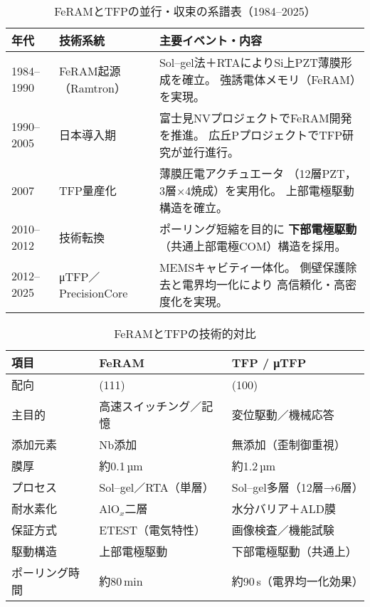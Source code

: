 \documentclass[conference]{IEEEtran}
\begin{document}
\begin{table}[!t]
\centering
\caption{FeRAMとTFPの並行・収束の系譜表（1984--2025）}
\label{tab:timeline}
\renewcommand{\arraystretch}{1.15}
\setlength{\tabcolsep}{2.5pt} %
\scriptsize %

\begin{tabular}{@{}p{1.3cm}p{2.3cm}p{5.0cm}@{}} %
\toprule
\textbf{年代} & \textbf{技術系統} & \textbf{主要イベント・内容} \\ \midrule

1984--1990 & FeRAM起源（Ramtron） &
Sol--gel法＋RTAによりSi上PZT薄膜形成を確立。
強誘電体メモリ（FeRAM）を実現。\\[3pt]

1990--2005 & 日本導入期 &
富士見NVプロジェクトでFeRAM開発を推進。
広丘PプロジェクトでTFP研究が並行進行。\\[3pt]

2007 & TFP量産化 &
薄膜圧電アクチュエータ
（12層PZT，3層×4焼成）を実用化。
上部電極駆動構造を確立。\\[3pt]

2010--2012 & 技術転換 &
ポーリング短縮を目的に
\textbf{下部電極駆動}
（共通上部電極COM）構造を採用。\\[3pt]

2012--2025 & μTFP／PrecisionCore &
MEMSキャビティ一体化。
側壁保護除去と電界均一化により
高信頼化・高密度化を実現。\\
\bottomrule
\end{tabular}

\normalsize
\end{table}

\begin{table}[!t]
\centering
\caption{FeRAMとTFPの技術的対比}
\label{tab:compare}
\renewcommand{\arraystretch}{1.1}
\setlength{\tabcolsep}{3pt} %
\scriptsize %
\begin{tabular}{@{}p{2.3cm}p{3.2cm}p{3.2cm}@{}} %
\toprule
\textbf{項目} & \textbf{FeRAM} & \textbf{TFP / μTFP} \\ \midrule
配向 & (111) & (100) \\[2pt]
主目的 & 高速スイッチング／記憶 & 変位駆動／機械応答 \\[2pt]
添加元素 & Nb添加 & 無添加（歪制御重視） \\[2pt]
膜厚 & 約0.1\,µm & 約1.2\,µm \\[2pt]
プロセス &
Sol--gel／RTA（単層） &
Sol--gel多層（12層→6層） \\[2pt]
耐水素化 &
AlO$_x$二層 &
水分バリア＋ALD膜 \\[2pt]
保証方式 &
ETEST（電気特性） &
画像検査／機能試験 \\[2pt]
駆動構造 &
上部電極駆動 &
下部電極駆動（共通上） \\[2pt]
ポーリング時間 &
約80\,min &
約90\,s（電界均一化効果） \\
\bottomrule
\end{tabular}
\normalsize
\end{table}
\end{document}
